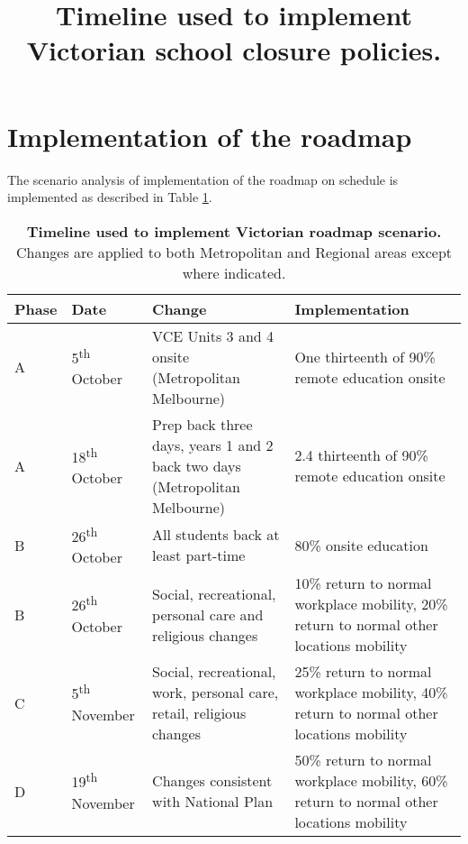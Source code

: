 \section{Implementation of the roadmap}

The scenario analysis of implementation of the roadmap on schedule is implemented as described in Table \ref{tab:roadmap}.
\begin{table}[ht]
\renewcommand{\baselinestretch}{1}
	\begin{tabular}[ht]{| p{1.8cm} | p{3.6cm} | p{3.6cm} | p{3.6cm} |}
	\hline
		Phase & Date & Change & Implementation \\
		\hline
		A & 5\textsuperscript{th} October & VCE Units 3 and 4 onsite (Metropolitan Melbourne) & One thirteenth of 90\% remote education onsite \\
		\hline
		A & 18\textsuperscript{th} October & Prep back three days, years 1 and 2 back two days (Metropolitan Melbourne) & 2.4 thirteenth of 90\% remote education onsite \\
		\hline
		B & 26\textsuperscript{th} October & All students back at least part-time & 80\% onsite education \\
		\hline
		B & 26\textsuperscript{th} October & Social, recreational, personal care and religious changes & 10\% return to normal workplace mobility, 20\% return to normal other locations mobility \\
		\hline
		C & 5\textsuperscript{th} November & Social, recreational, work, personal care, retail, religious changes & 25\% return to normal workplace mobility, 40\% return to normal other locations mobility \\
		\hline
		D & 19\textsuperscript{th} November & Changes consistent with National Plan & 50\% return to normal workplace mobility, 60\% return to normal other locations mobility \\
		\hline		
    \end{tabular}
    \title{Timeline used to implement Victorian school closure policies.}
    \caption{\textbf{Timeline used to implement Victorian roadmap scenario.} Changes are applied to both Metropolitan and Regional areas except where indicated.}
    \label{tab:roadmap}
\end{table}